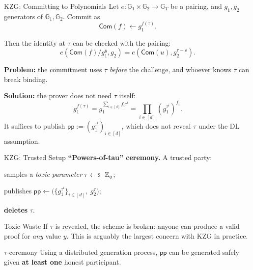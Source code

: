 \documentclass{zkdl-presentation-template}
\begin{document}
    \begin{frame}{KZG: Committing to Polynomials}
        \small
        Let $e: \mathbb{G}_1 \times \mathbb{G}_2 \to \mathbb{G}_T$ be a pairing, and $g_1, g_2$ generators of $\mathbb{G}_1, \mathbb{G}_2$. Commit as
        \begin{equation*}
            \mathsf{Com}(f) \gets g_1^{f(\tau)}.
        \end{equation*}
        \pause

        Then the identity at $\tau$ can be checked with the pairing:
        \begin{equation*}
            e(\mathsf{Com}(f)/g_1^{y}, g_2) = e(\mathsf{Com}(u), g_2^{\tau - \rho}).
        \end{equation*}
        \pause

        \textcolor{oc-red-8}{\textbf{Problem:}} the commitment uses $\tau$ \emph{before} the challenge, and whoever knows $\tau$ can break binding.
        \pause

        \textcolor{oc-green-8}{\textbf{Solution:}} the prover does not need $\tau$ itself:
        \begin{equation*}
            g_1^{f(\tau)} = g_1^{\sum_{i \in [d]} f_i \tau^i} = \prod_{i \in [d]} \left(g_1^{\tau^i}\right)^{f_i}.
        \end{equation*}
        It suffices to publish $\mathsf{pp} := (g_1^{\tau^i})_{i \in [d]}$, which does not reveal $\tau$ under the DL assumption.
    \end{frame}

    \begin{frame}{KZG: Trusted Setup}
        \textbf{``Powers-of-tau'' ceremony.} A trusted party:
        \begin{algoen}
            \item samples a \emph{toxic parameter} $\tau \leftarrowS \mathbb{Z}_q$;
            \item publishes $\mathsf{pp} \gets \big(\{g_1^{\tau^i}\}_{i \in [d]}, \; g_2^{\tau}\big)$;
            \item \textbf{deletes} $\tau$.
        \end{algoen}
        \pause

        \begin{alertblock}{Toxic Waste}
            If $\tau$ is revealed, the scheme is broken: anyone can produce a valid proof for \emph{any} value $y$.
            This is arguably the largest concern with KZG in practice.
        \end{alertblock}
        \pause

        \begin{remarkblock}{$\tau$-ceremony}
            Using a distributed generation process, $\mathsf{pp}$ can be generated safely given \textbf{at least one} honest participant.
        \end{remarkblock}
    \end{frame}
\end{document}
